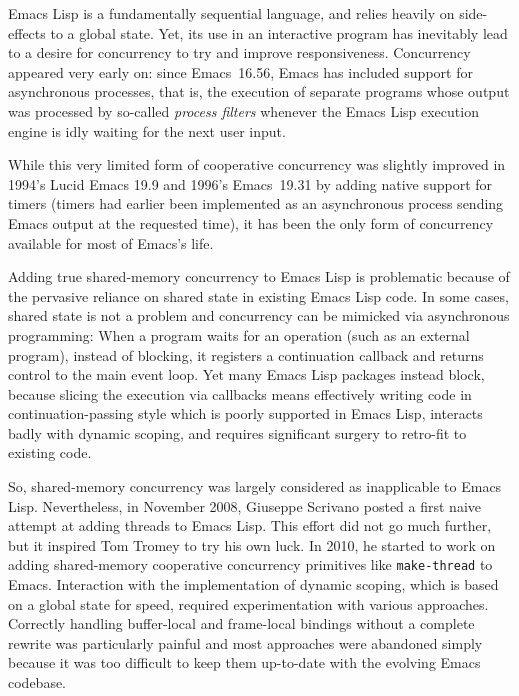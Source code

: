 \documentclass[format=acmsmall,screen]{acmart}
\newcommand \Elisp {Emacs Lisp}
\begin{document}
\Elisp{} is a fundamentally sequential language, and relies heavily
on side-effects to a global state.  Yet, its use in an interactive program
has inevitably lead to a desire for concurrency to try and improve
responsiveness.  Concurrency appeared very early on: since
Emacs~16.56, Emacs has included support for asynchronous processes,
that is, the
execution of separate programs whose output was processed by so-called
\emph{process filters} whenever the \Elisp{} execution engine is idly
waiting for the next user input.

While this very limited form of cooperative concurrency was slightly
improved in 1994's Lucid Emacs 19.9 and 1996's Emacs~19.31 by adding
native support for timers
(timers
had earlier been implemented as an asynchronous process sending Emacs output at
the requested time), it has been the only form of concurrency available for
most of Emacs's life.

Adding true shared-memory concurrency to \Elisp{} is problematic because of
the pervasive reliance on shared state in existing \Elisp{} code.  In some
cases, shared state is not a problem and concurrency can be mimicked via
asynchronous programming: When a program waits for an operation (such as an
external program), instead of blocking, it registers a continuation callback
and returns control to the main event loop.  Yet many \Elisp{} packages
instead block, because slicing the execution via callbacks means effectively
writing code in continuation-passing style which is poorly supported in
\Elisp{}, interacts badly with dynamic scoping, and requires significant
surgery to retro-fit to existing code.

So, shared-memory concurrency was largely considered as inapplicable to
\Elisp{}.  Nevertheless, in November 2008, Giuseppe Scrivano posted a first
naive attempt at adding threads to \Elisp{}.  This effort did not go much
further, but it inspired Tom Tromey to try his own luck.
In 2010, he started to work on adding shared-memory cooperative concurrency
primitives like \texttt{make-thread} to Emacs.  Interaction with the
implementation of dynamic scoping, which is based on a global state for
speed, required experimentation with various approaches.  Correctly handling
buffer-local and frame-local bindings without a complete rewrite was
particularly painful and most approaches were abandoned simply because it
was too difficult to keep them up-to-date with the evolving Emacs codebase.
\end{document}
